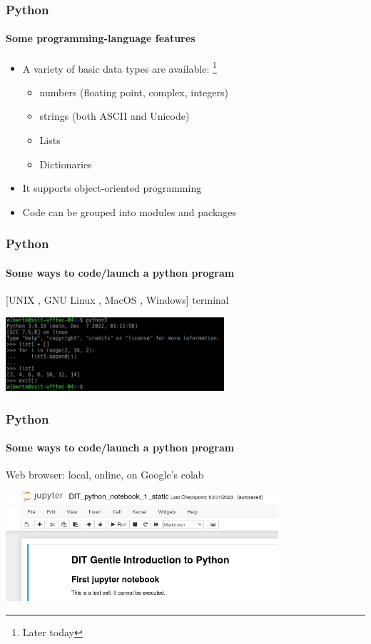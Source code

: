 \documentclass{beamer}
\begin{document}
\begin{frame}
\frametitle{Python}
\framesubtitle{Some programming-language features}

\begin{itemize}
\item A variety of basic data types are available:%
\footnote{Later today}
\begin{itemize}
 \item numbers (floating point, complex, integers)
 \item strings (both ASCII and Unicode)
 \item Lists
 \item Dictionaries
\end{itemize}			\pause 
 
\item It supports object-oriented programming

\item Code can be grouped into modules and packages
\end{itemize}
\end{frame}

\begin{frame}
\frametitle{Python}
\framesubtitle{Some ways to code/launch a python program}

[UNIX , GNU Linux , MacOS , Windows] terminal

\begin{center}
 \includegraphics[width=81mm]{img/python_on_konsole.png}
\end{center}
\end{frame}

\begin{frame}
\frametitle{Python}
\framesubtitle{Some ways to code/launch a python program}

Web browser: local, online, on Google's colab

\begin{center}
 \includegraphics[width=101mm]{img/python_on_jupyter.png}
\end{center}
\end{frame}
\end{document}
